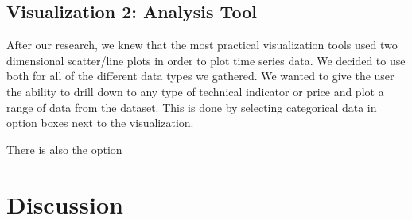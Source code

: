 \documentclass{vgtc}                          %
\begin{document}
\subsection{Visualization 2: Analysis Tool}
After our research, we knew that the most practical visualization tools used two dimensional scatter/line plots in order to plot time series data.  We decided to use both for all of the different data types we gathered. We wanted to give the user the ability to drill down to any type of technical indicator or price and plot a range of data from the dataset.  This is done by selecting categorical data in option boxes next to the visualization.  

There is also the option

\begin{figure}[h]
	\centering
\end{figure}


\section{Discussion}


%

%
%
%


\end{document}
